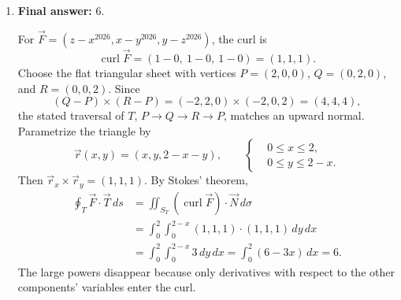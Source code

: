 \documentclass[12pt]{exam}
\begin{document}
\begin{enumerate}
\bigskip
\item \textbf{Final answer:} $\boxed{6}$.

For $\vec F=(z-x^{2026},x-y^{2026},y-z^{2026})$, the curl is
\[
\operatorname{curl}\vec F
=(1-0,\ 1-0,\ 1-0)=(1,1,1).
\]
Choose the flat triangular sheet with vertices
$P=(2,0,0)$, $Q=(0,2,0)$, and $R=(0,0,2)$.
Since
\[
(Q-P)\times(R-P)=(-2,2,0)\times(-2,0,2)=(4,4,4),
\]
the stated traversal of $T$, $P\to Q\to R\to P$, matches an upward normal.
Parametrize the triangle by
\[
\vec r(x,y)=(x,y,2-x-y),\qquad
\left\{
\begin{aligned}
&0\le x\le2,\\
&0\le y\le2-x.
\end{aligned}
\right.
\]
Then $\vec r_x\times\vec r_y=(1,1,1)$. By Stokes' theorem,
\[
\begin{aligned}
\oint_T\vec F\cdot\vec T\,ds
&=\iint_{S_T}(\operatorname{curl}\vec F)\cdot\vec N\,d\sigma\\
&=\int_0^2\int_0^{2-x}(1,1,1)\cdot(1,1,1)\,dy\,dx\\
&=\int_0^2\int_0^{2-x}3\,dy\,dx
=\int_0^2(6-3x)\,dx=6.
\end{aligned}
\]
The large powers disappear because only derivatives with respect to the
other components' variables enter the curl.

\end{enumerate}
\end{document}
